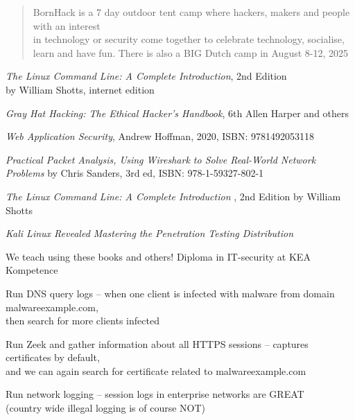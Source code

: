 \documentclass[Screen16to9,17pt]{foils}
\begin{document}
\begin{quote}
BornHack is a 7 day outdoor tent camp where hackers, makers and people with an interest\\
in technology or security come together to celebrate technology, socialise, learn and have fun. There is also a BIG Dutch camp in August 8-12, 2025 
\end{quote}

\myquestionspage



\begin{list2}
\item \emph{The Linux Command Line: A Complete Introduction}, 2nd Edition\\
 by William Shotts, internet edition 

\item \emph{Gray Hat Hacking: The Ethical Hacker's Handbook}, 6th Allen Harper and others
\item \emph{Web Application Security}, Andrew Hoffman, 2020, ISBN: 9781492053118
\item \emph{Practical Packet Analysis, Using Wireshark to Solve Real-World Network Problems}
by Chris Sanders, 3rd ed, ISBN: 978-1-59327-802-1
\item \emph{The Linux Command Line: A Complete Introduction }, 2nd Edition
by William Shotts 
\item \emph{Kali Linux Revealed Mastering the Penetration Testing Distribution}\\
\end{list2}


We teach using these books and others! Diploma in IT-security at KEA Kompetence\\




\begin{list2}
\item Run DNS query logs -- when one client is infected with malware from domain malwareexample.com,\\
 then search for more clients infected
\item Run Zeek and gather information about all HTTPS sessions -- captures certificates by default,\\
and we can again search for certificate related to malwareexample.com
\item Run network logging -- session logs in enterprise networks are GREAT \\
(country wide illegal logging is of course NOT)
\end{list2}
\end{document}
